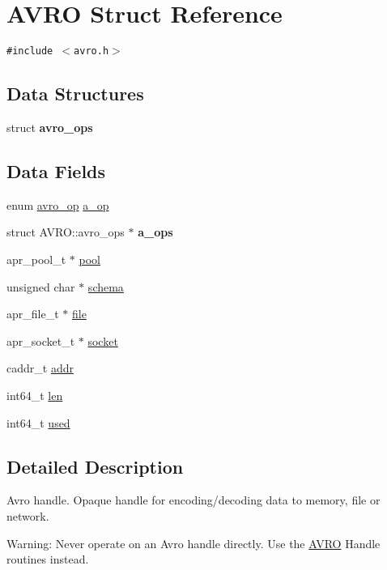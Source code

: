\hypertarget{struct_a_v_r_o}{
\section{AVRO Struct Reference}
\label{struct_a_v_r_o}
}
{\tt \#include $<$avro.h$>$}

\subsection*{Data Structures}
\begin{CompactItemize}
\item 
struct \textbf{avro\_\-ops}
\end{CompactItemize}
\subsection*{Data Fields}
\begin{CompactItemize}
\item 
enum \hyperlink{group___handle___routines_gcd8ee9ad4a4882eef8e3d9a0d5faec68}{avro\_\-op} \hyperlink{struct_a_v_r_o_7291c82adfe53e2d895824663e028e8e}{a\_\-op}
\item 
\hypertarget{struct_a_v_r_o_8eb2c9c88718b2c7976429af135348e9}{
struct AVRO::avro\_\-ops $\ast$ \textbf{a\_\-ops}}
\label{struct_a_v_r_o_8eb2c9c88718b2c7976429af135348e9}

\item 
apr\_\-pool\_\-t $\ast$ \hyperlink{struct_a_v_r_o_b4cc960de06bd42633124a8a62852928}{pool}
\item 
unsigned char $\ast$ \hyperlink{struct_a_v_r_o_e6ff7776029faa4c4d7053f0cb7b71e5}{schema}
\item 
apr\_\-file\_\-t $\ast$ \hyperlink{struct_a_v_r_o_adc436b34c7426022b819cdc2d6ced6e}{file}
\item 
apr\_\-socket\_\-t $\ast$ \hyperlink{struct_a_v_r_o_33d50daaa50ad7ec3c4e22d4f1eb6143}{socket}
\item 
caddr\_\-t \hyperlink{struct_a_v_r_o_b1c64881a5280cceb600f316fbb07952}{addr}
\item 
int64\_\-t \hyperlink{struct_a_v_r_o_167d3abd38fca62643a5ceb0c34711bc}{len}
\item 
int64\_\-t \hyperlink{struct_a_v_r_o_4ce667da8e13c2b9c464aa76b414ab82}{used}
\end{CompactItemize}


\subsection{Detailed Description}
Avro handle. Opaque handle for encoding/decoding data to memory, file or network. \begin{Desc}
\item[Warning:]Never operate on an Avro handle directly. Use the \hyperlink{struct_a_v_r_o}{AVRO} Handle routines instead. \end{Desc}


